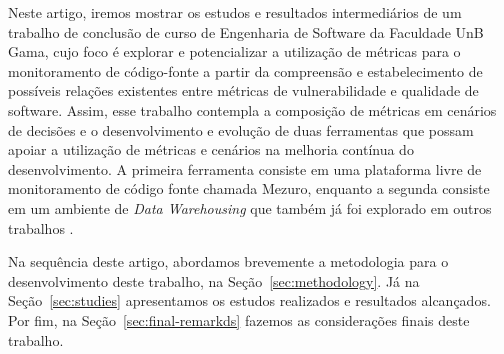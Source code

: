 Neste artigo, iremos mostrar os estudos e resultados intermediários de um trabalho de conclusão de curso de Engenharia de Software da Faculdade UnB Gama, cujo foco é explorar e potencializar a utilização de métricas para o monitoramento de código-fonte a partir da compreensão e estabelecimento de possíveis relações existentes entre métricas de vulnerabilidade e qualidade de software. Assim, esse trabalho contempla a composição de métricas em cenários de decisões e o desenvolvimento e evolução de duas ferramentas que possam apoiar a utilização de métricas e cenários na melhoria contínua do desenvolvimento. A primeira ferramenta consiste em uma plataforma livre de monitoramento de código fonte chamada Mezuro, enquanto a segunda consiste em um ambiente de \emph{Data Warehousing} que também já foi explorado em outros trabalhos \cite{mazuco2011}.

Na sequência deste artigo, abordamos brevemente a metodologia para o desenvolvimento deste trabalho, na Seção~\ref{sec:methodology}. Já na Seção~\ref{sec:studies} apresentamos os estudos realizados e resultados alcançados. Por fim, na Seção~\ref{sec:final-remarkds} fazemos as considerações finais deste trabalho.



